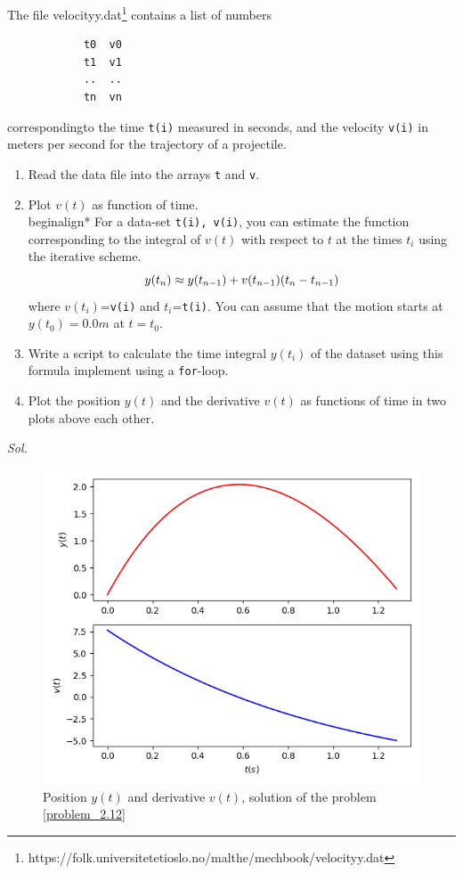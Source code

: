     \begin{problem}\label{problem_2.12}
        The file velocityy.dat\footnote[2]{https://folk.universitetetioslo.no/malthe/mechbook/velocityy.dat} contains a list of numbers
        \begin{verbatim}
            t0  v0
            t1  v1 
            ..  ..
            tn  vn
        \end{verbatim}
        correspondingto the time \verb|t(i)| measured in seconds, and the velocity \verb|v(i)| in meters per second for the trajectory of a projectile.
        \begin{enumerate}
            \item Read the data file into the arrays \verb|t| and \verb|v|.
            \item Plot $v(t)$ as function of time. \\begin{align*}
                For a data-set \verb|t(i), v(i)|, you can estimate the function corresponding to the integral of $v(t)$ with  respect to $t$ at the times $t_i$ using the iterative scheme.
                \begin{equation} \label{eqt: 2_12_1}
                    y(t_n) \approx y(t_{n-1}) + v(t_{n-1})\qty(t_{n}-t_{n-1})
                \end{equation}
                where $v(t_{i})$=\verb|v(i)| and $t_{i}$=\verb|t(i)|. You can assume that the motion starts at $y(t_0)=0.0m$ at $t=t_0$.
            \item Write a script to calculate the time integral $y(t_i)$ of the dataset using this formula implement using a \verb|for|-loop.
            \item Plot the position $y(t)$ and the derivative $v(t)$ as functions of time in two plots above each other.
        \end{enumerate}
    \end{problem}
    \textit{ Sol. }
    
    \begin{figure}[h!]
        \centering
        \includegraphics[width=\linewidth]{img/chapter2/2-12/2_12-png.png}
        \caption{Position $y(t)$  and derivative $v(t)$, solution of the problem \ref{problem_2.12}}
        \label{fig: problem 2-12}
    \end{figure}